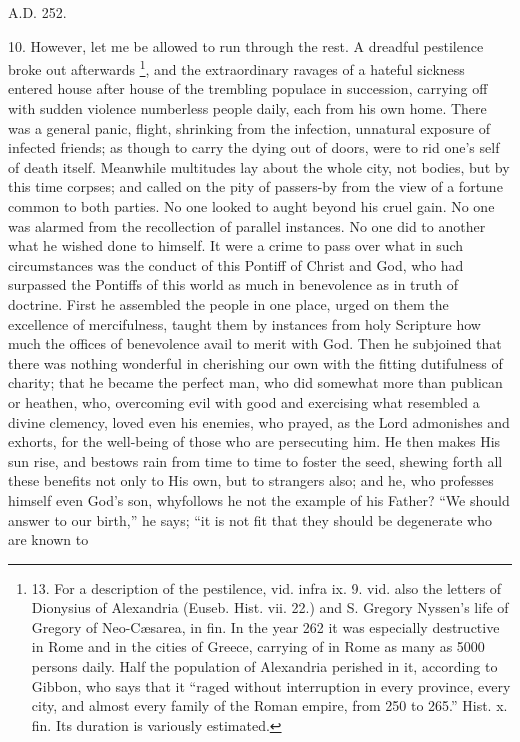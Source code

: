 A.D. 252.

10. However, let me be allowed to run through the rest. A dreadful
pestilence broke out afterwards \footnote{13. For a
description of the pestilence, vid. infra ix. 9. vid. also the letters
of Dionysius of Alexandria (Euseb. Hist. vii. 22.) and S. Gregory
Nyssen's life of Gregory of Neo-Cæsarea, in fin. In the year 262 it
was especially destructive in Rome and in the cities of Greece,
carrying of in Rome as many as 5000 persons daily. Half the population
of Alexandria perished in it, according to Gibbon, who says that it ``raged
without interruption in every province, every city, and almost every
family of the Roman empire, from 250 to 265.'' Hist. x. fin. Its
duration is variously estimated.}, and the extraordinary ravages of a hateful sickness
entered house after house of the trembling populace in succession,
carrying off with sudden violence numberless people daily, each from
his own home. There was a general panic, flight, shrinking from the
infection, unnatural exposure of infected friends; as though to carry
the dying out of doors, were to rid one's self of death itself.
Meanwhile multitudes lay about the whole city, not bodies, but by this
time corpses; and called on the pity of passers-by from the view of a
fortune common to both parties. No one looked to aught beyond his
cruel gain. No one was alarmed from the recollection of parallel
instances. No one did to another what he wished done to himself. It
were a crime to pass over what in such circumstances was the conduct
of this Pontiff of Christ and God, who had surpassed the Pontiffs of
this world as much in benevolence as in truth of doctrine. First he
assembled the people in one place, urged on them the excellence of
mercifulness, taught them by instances from holy Scripture how much
the offices of benevolence avail to merit with God. Then he subjoined
that there was nothing wonderful in cherishing our own with the
fitting dutifulness of charity; that he became the perfect man, who
did somewhat more than publican or heathen, who, overcoming evil with
good and exercising what resembled a divine clemency, loved even his
enemies, who prayed, as the Lord admonishes and exhorts, for the
well-being of those who are persecuting him. He then makes His sun
rise, and bestows rain from time to time to foster the seed, shewing
forth all these benefits not only to His own, but to strangers also;
and he, who professes himself even God's son, why\emph{}follows he
not the example of his Father? ``We should answer to our birth,'' he
says; ``it is not fit that they should be degenerate who are known to
